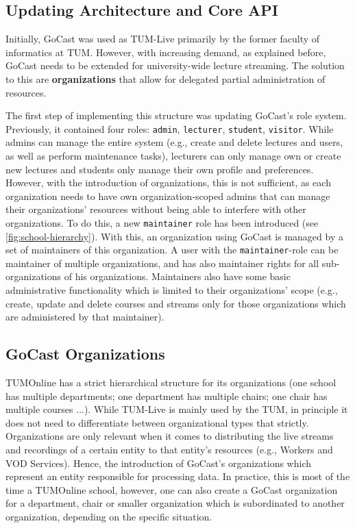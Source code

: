 \subsection{Updating Architecture and Core API}

Initially, GoCast was used as TUM-Live primarily by the former faculty of informatics at \ac{TUM}. However, with increasing demand, as explained before, GoCast needs to be extended for university-wide lecture streaming. The solution to this are \textbf{organizations} that allow for delegated partial administration of resources.

The first step of implementing this structure was updating GoCast's role system. Previously, it contained four roles: \texttt{admin}, \texttt{lecturer}, \texttt{student}, \texttt{visitor}. While admins can manage the entire system (e.g., create and delete lectures and users, as well as perform maintenance tasks), lecturers can only manage own or create new lectures and students only manage their own profile and preferences. However, with the introduction of organizations, this is not sufficient, as each organization needs to have own organization-scoped admins that can manage their organizations' resources without being able to interfere with other organizations. To do this, a new \texttt{maintainer} role has been introduced (see \autoref{fig:school-hierarchy}).
With this, an organization using GoCast is managed by a set of maintainers of this organization. A user with the \texttt{maintainer}-role can be maintainer of multiple organizations, and has also maintainer rights for all sub-organizations of his organizations.  
Maintainers also have some basic administrative functionality which is limited to their organizations' scope (e.g., create, update and delete courses and streams only for those organizations which are administered by that maintainer). 

\subsection{GoCast Organizations}

TUMOnline has a strict hierarchical structure for its organizations (one school has multiple departments; one department has multiple chairs; one chair has multiple courses ...).
%
While TUM-Live is mainly used by the TUM, in principle it does not need to differentiate between organizational types that strictly. Organizations are only relevant when it comes to distributing the live streams and recordings of a certain entity to that entity's resources (e.g., Workers and VOD Services). Hence, the introduction of GoCast's organizations which represent an entity responsible for processing data. In practice, this is most of the time a TUMOnline school, however, one can also create a GoCast organization for a department, chair or smaller organization which is subordinated to another organization, depending on the specific situation.

